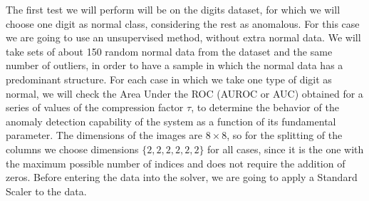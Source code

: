 \documentclass{article}
\begin{document}
The first test we will perform will be on the digits dataset, for which we will choose one digit as normal class, considering the rest as anomalous. For this case we are going to use an unsupervised method, without extra normal data. We will take sets of about 150 random normal data from the dataset and the same number of outliers, in order to have a sample in which the normal data has a predominant structure. For each case in which we take one type of digit as normal, we will check the Area Under the ROC (AUROC or AUC) obtained for a series of values of the compression factor $\tau$, to determine the behavior of the anomaly detection capability of the system as a function of its fundamental parameter. The dimensions of the images are $8\times 8$, so for the splitting of the columns we choose dimensions $\{2,2,2,2,2,2\}$ for all cases, since it is the one with the maximum possible number of indices and does not require the addition of zeros. Before entering the data into the solver, we are going to apply a Standard Scaler to the data.
\end{document}
